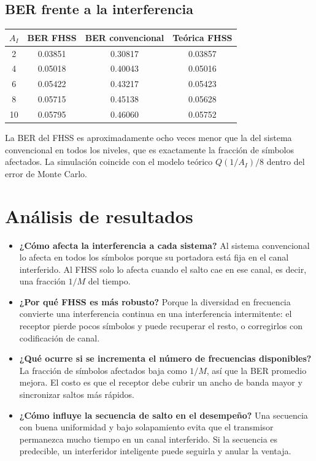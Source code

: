 \documentclass[11pt,a4paper]{article}
\begin{document}
\subsection{BER frente a la interferencia}

\begin{tabular}{@{}cccc@{}}
  \toprule
  $A_I$ & BER FHSS & BER convencional & Teórica FHSS \\
  \midrule
  2  & 0.03851 & 0.30817 & 0.03857 \\
  4  & 0.05018 & 0.40043 & 0.05016 \\
  6  & 0.05422 & 0.43217 & 0.05423 \\
  8  & 0.05715 & 0.45138 & 0.05628 \\
  10 & 0.05795 & 0.46060 & 0.05752 \\
  \bottomrule
\end{tabular}


La BER del FHSS es aproximadamente ocho veces menor que la del sistema convencional en
todos los niveles, que es exactamente la fracción de símbolos afectados. La simulación
coincide con el modelo teórico $Q(1/A_I)/8$ dentro del error de Monte Carlo.

\section{Análisis de resultados}

\begin{itemize}
  \item \textbf{¿Cómo afecta la interferencia a cada sistema?} Al sistema convencional lo
        afecta en todos los símbolos porque su portadora está fija en el canal interferido.
        Al FHSS solo lo afecta cuando el salto cae en ese canal, es decir, una fracción
        $1/M$ del tiempo.
  \item \textbf{¿Por qué FHSS es más robusto?} Porque la diversidad en frecuencia convierte
        una interferencia continua en una interferencia intermitente: el receptor pierde
        pocos símbolos y puede recuperar el resto, o corregirlos con codificación de canal.
  \item \textbf{¿Qué ocurre si se incrementa el número de frecuencias disponibles?} La
        fracción de símbolos afectados baja como $1/M$, así que la BER promedio mejora.
        El costo es que el receptor debe cubrir un ancho de banda mayor y sincronizar
        saltos más rápidos.
  \item \textbf{¿Cómo influye la secuencia de salto en el desempeño?} Una secuencia con
        buena uniformidad y bajo solapamiento evita que el transmisor permanezca mucho
        tiempo en un canal interferido. Si la secuencia es predecible, un interferidor
        inteligente puede seguirla y anular la ventaja.
\end{itemize}
\end{document}
